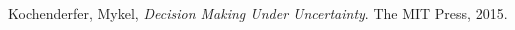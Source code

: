\documentclass[11pt]{article}
\begin{document}

\begin{thebibliography}{999}
	Kochenderfer, Mykel,
	\emph{Decision Making Under Uncertainty}.
	The MIT Press, 2015.

\end{thebibliography}
\end{document}
